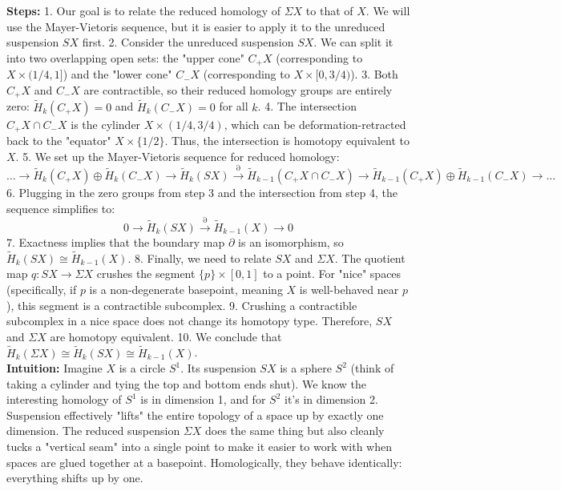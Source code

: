 \begin{solution}
\textbf{Steps:}
1. Our goal is to relate the reduced homology of $\Sigma X$ to that of $X$. We will use the Mayer-Vietoris sequence, but it is easier to apply it to the unreduced suspension $SX$ first.
2. Consider the unreduced suspension $SX$. We can split it into two overlapping open sets: the "upper cone" $C_+X$ (corresponding to $X \times (1/4, 1]$) and the "lower cone" $C_-X$ (corresponding to $X \times [0, 3/4)$).
3. Both $C_+X$ and $C_-X$ are contractible, so their reduced homology groups are entirely zero: $\tilde{H}_k(C_+X) = 0$ and $\tilde{H}_k(C_-X) = 0$ for all $k$.
4. The intersection $C_+X \cap C_-X$ is the cylinder $X \times (1/4, 3/4)$, which can be deformation-retracted back to the "equator" $X \times \{1/2\}$. Thus, the intersection is homotopy equivalent to $X$.
5. We set up the Mayer-Vietoris sequence for reduced homology:
   \[ \dots \to \tilde{H}_k(C_+X) \oplus \tilde{H}_k(C_-X) \to \tilde{H}_k(SX) \xrightarrow{\partial} \tilde{H}_{k-1}(C_+X \cap C_-X) \to \tilde{H}_{k-1}(C_+X) \oplus \tilde{H}_{k-1}(C_-X) \to \dots \]
6. Plugging in the zero groups from step 3 and the intersection from step 4, the sequence simplifies to:
   \[ 0 \to \tilde{H}_k(SX) \xrightarrow{\partial} \tilde{H}_{k-1}(X) \to 0 \]
7. Exactness implies that the boundary map $\partial$ is an isomorphism, so $\tilde{H}_k(SX) \cong \tilde{H}_{k-1}(X)$.
8. Finally, we need to relate $SX$ and $\Sigma X$. The quotient map $q: SX \to \Sigma X$ crushes the segment $\{p\} \times [0, 1]$ to a point. For "nice" spaces (specifically, if $p$ is a non-degenerate basepoint, meaning $X$ is well-behaved near $p$), this segment is a contractible subcomplex.
9. Crushing a contractible subcomplex in a nice space does not change its homotopy type. Therefore, $SX$ and $\Sigma X$ are homotopy equivalent.
10. We conclude that $\tilde{H}_k(\Sigma X) \cong \tilde{H}_k(SX) \cong \tilde{H}_{k-1}(X)$.\\[2ex]

\textbf{Intuition:}
Imagine $X$ is a circle $S^1$. Its suspension $SX$ is a sphere $S^2$ (think of taking a cylinder and tying the top and bottom ends shut). We know the interesting homology of $S^1$ is in dimension 1, and for $S^2$ it's in dimension 2. Suspension effectively "lifts" the entire topology of a space up by exactly one dimension. The reduced suspension $\Sigma X$ does the same thing but also cleanly tucks a "vertical seam" into a single point to make it easier to work with when spaces are glued together at a basepoint. Homologically, they behave identically: everything shifts up by one.
\end{solution}

